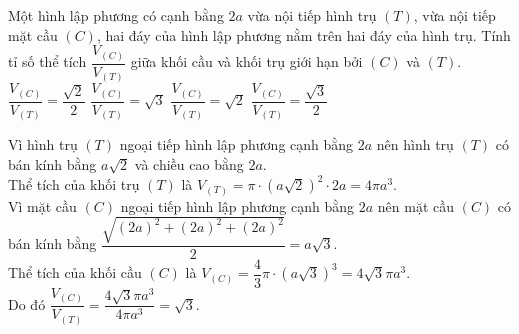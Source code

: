 \begin{ex}%
 Một hình lập phương có cạnh bằng $2a$ vừa nội tiếp hình trụ $(T)$, vừa nội tiếp mặt cầu $(C)$, hai đáy của hình lập phương nằm trên hai đáy của hình trụ. Tính tỉ số thể tích $\dfrac{V_{(C)}}{V_{(T)}}$ giữa khối cầu và khối trụ giới hạn bởi $(C)$ và $(T)$.
 \choice
  {$\dfrac{V_{(C)}}{V_{(T)}} = \dfrac{\sqrt{2}}{2}$}
  {\True $\dfrac{V_{(C)}}{V_{(T)}} = \sqrt{3}$}
  {$\dfrac{V_{(C)}}{V_{(T)}} = \sqrt{2}$}
  {$\dfrac{V_{(C)}}{V_{(T)}} = \dfrac{\sqrt{3}}{2}$}
 \loigiai
  {
  \immini
   {
   Vì hình trụ $(T)$ ngoại tiếp hình lập phương cạnh bằng $2a$ nên hình trụ $(T)$ có bán kính bằng $a\sqrt{2}$ và chiều cao bằng $2a$.\\
   Thể tích của khối trụ $(T)$ là $V_{(T)} = \pi \cdot \left( a\sqrt{2} \right)^2 \cdot 2a = 4\pi a^3$.\\
   Vì mặt cầu $(C)$ ngoại tiếp hình lập phương cạnh bằng $2a$ nên mặt cầu $(C)$ có bán kính bằng $\dfrac{\sqrt{(2a)^2 + (2a)^2 + (2a)^2}}{2} = a\sqrt{3}$.\\
   Thể tích của khối cầu $(C)$ là $V_{(C)} = \dfrac{4}{3}\pi \cdot \left( a\sqrt{3} \right)^3 = 4\sqrt{3}\pi a^3$.\\
   Do đó $\dfrac{V_{(C)}}{V_{(T)}} = \dfrac{4 \sqrt{3} \pi a^3}{4 \pi a^3} = \sqrt{3}$.
   }
   {
   }
  }
\end{ex}


